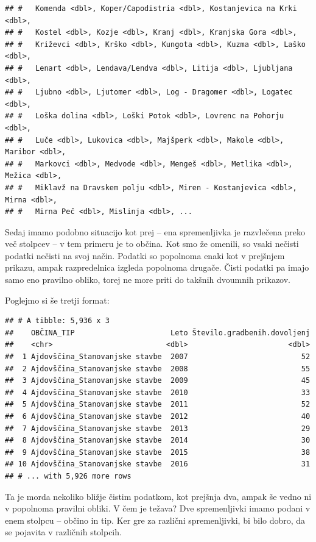 \documentclass[
]{book}
\begin{document}
\begin{verbatim}
## #   Komenda <dbl>, Koper/Capodistria <dbl>, Kostanjevica na Krki <dbl>,
## #   Kostel <dbl>, Kozje <dbl>, Kranj <dbl>, Kranjska Gora <dbl>,
## #   Križevci <dbl>, Krško <dbl>, Kungota <dbl>, Kuzma <dbl>, Laško <dbl>,
## #   Lenart <dbl>, Lendava/Lendva <dbl>, Litija <dbl>, Ljubljana <dbl>,
## #   Ljubno <dbl>, Ljutomer <dbl>, Log - Dragomer <dbl>, Logatec <dbl>,
## #   Loška dolina <dbl>, Loški Potok <dbl>, Lovrenc na Pohorju <dbl>,
## #   Luče <dbl>, Lukovica <dbl>, Majšperk <dbl>, Makole <dbl>, Maribor <dbl>,
## #   Markovci <dbl>, Medvode <dbl>, Mengeš <dbl>, Metlika <dbl>, Mežica <dbl>,
## #   Miklavž na Dravskem polju <dbl>, Miren - Kostanjevica <dbl>, Mirna <dbl>,
## #   Mirna Peč <dbl>, Mislinja <dbl>, ...
\end{verbatim}

Sedaj imamo podobno situacijo kot prej -- ena spremenljivka je razvlečena preko več stolpcev -- v tem primeru je to občina. Kot smo že omenili, so vsaki nečisti podatki nečisti na svoj način. Podatki so popolnoma enaki kot v prejšnjem prikazu, ampak razpredelnica izgleda popolnoma drugače. Čisti podatki pa imajo samo eno pravilno obliko, torej ne more priti do takšnih dvoumnih prikazov.

Poglejmo si še tretji format:

\begin{verbatim}
## # A tibble: 5,936 x 3
##    OBČINA_TIP                      Leto Število.gradbenih.dovoljenj
##    <chr>                          <dbl>                       <dbl>
##  1 Ajdovščina_Stanovanjske stavbe  2007                          52
##  2 Ajdovščina_Stanovanjske stavbe  2008                          55
##  3 Ajdovščina_Stanovanjske stavbe  2009                          45
##  4 Ajdovščina_Stanovanjske stavbe  2010                          33
##  5 Ajdovščina_Stanovanjske stavbe  2011                          52
##  6 Ajdovščina_Stanovanjske stavbe  2012                          40
##  7 Ajdovščina_Stanovanjske stavbe  2013                          29
##  8 Ajdovščina_Stanovanjske stavbe  2014                          30
##  9 Ajdovščina_Stanovanjske stavbe  2015                          38
## 10 Ajdovščina_Stanovanjske stavbe  2016                          31
## # ... with 5,926 more rows
\end{verbatim}

Ta je morda nekoliko bližje čistim podatkom, kot prejšnja dva, ampak še vedno ni v popolnoma pravilni obliki. V čem je težava? Dve spremenljivki imamo podani v enem stolpcu -- občino in tip. Ker gre za različni spremenljivki, bi bilo dobro, da se pojavita v različnih stolpcih.
\end{document}
